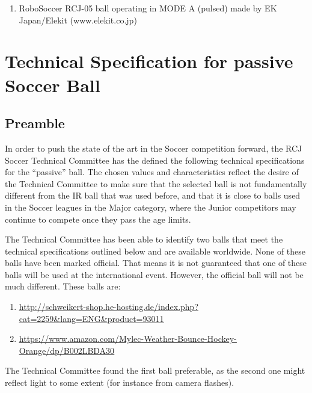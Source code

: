 \documentclass{article}
\begin{document}
\begin{enumerate}
    \item RoboSoccer RCJ-05 ball operating in MODE A (pulsed) made by EK Japan/Elekit (www.elekit.co.jp)
\end{enumerate}

\section{Technical Specification for passive Soccer Ball\label{ref-passive-spec}}

\subsection{Preamble}

In order to push the state of the art in the Soccer competition forward, the
RCJ Soccer Technical Committee has the defined the following technical
specifications for the ``passive'' ball. The chosen values and characteristics
reflect the desire of the Technical Committee to make sure that the selected
ball is not fundamentally different from the IR ball that was used before, and
that it is close to balls used in the Soccer leagues in the Major category,
where the Junior competitors may continue to compete once they pass the age
limits.

The Technical Committee has been able to identify two balls that meet the
technical specifications outlined below and are available worldwide. None of
these balls have been marked official. That means it is not guaranteed that one
of these balls will be used at the international event. However, the official
ball will not be much different. These balls are:

\begin{enumerate}

\item \underline{\href{http://schweikert-shop.he-hosting.de/index.php?cat=2259&lang=ENG&product=93011}{http://schweikert-shop.he-hosting.de/index.php?cat=2259\&lang=ENG\&product=93011}}

\item \underline{\href{https://www.amazon.com/Mylec-Weather-Bounce-Hockey-Orange/dp/B002LBDA30}{https://www.amazon.com/Mylec-Weather-Bounce-Hockey-Orange/dp/B002LBDA30}}

\end{enumerate}

The Technical Committee found the first ball preferable, as the second one
might reflect light to some extent (for instance from camera flashes).
\end{document}
